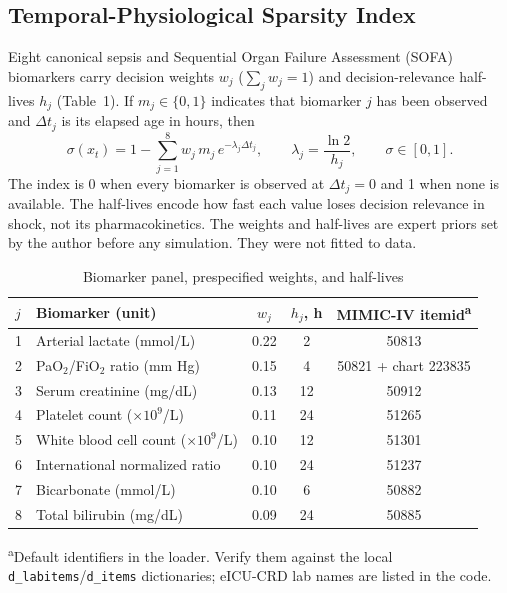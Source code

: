 \documentclass[11pt]{article}
\begin{document}
\subsection{Temporal-Physiological Sparsity Index}
Eight canonical sepsis and Sequential Organ Failure Assessment (SOFA) biomarkers\cite{singer2016,vincent1996} carry
decision weights $w_j$ ($\sum_j w_j=1$) and decision-relevance half-lives $h_j$ (Table~1). If $m_j\in\{0,1\}$ indicates
that biomarker $j$ has been observed and $\Delta t_j$ is its elapsed age in hours, then
\begin{equation}
\sigma(x_t)=1-\sum_{j=1}^{8} w_j\, m_j\, e^{-\lambda_j \Delta t_j},\qquad \lambda_j=\frac{\ln 2}{h_j},\qquad \sigma\in[0,1].
\end{equation}
The index is 0 when every biomarker is observed at $\Delta t_j=0$ and 1 when none is available. The half-lives encode how
fast each value loses decision relevance in shock, not its pharmacokinetics. The weights and half-lives are expert
priors set by the author before any simulation. They were not fitted to data.

\begin{table}[t]\centering\small
\caption{Biomarker panel, prespecified weights, and half-lives}
\begin{tabularx}{\linewidth}{lYccc}
\toprule
$j$ & Biomarker (unit) & $w_j$ & $h_j$, h & MIMIC-IV itemid\textsuperscript{a}\\
 & Arterial lactate (mmol/L) & 0.22 & 2 & 50813\\
2 & PaO$_2$/FiO$_2$ ratio (mm Hg) & 0.15 & 4 & 50821 + chart 223835\\
3 & Serum creatinine (mg/dL) & 0.13 & 12 & 50912\\
4 & Platelet count ($\times10^9$/L) & 0.11 & 24 & 51265\\
5 & White blood cell count ($\times10^9$/L) & 0.10 & 12 & 51301\\
6 & International normalized ratio & 0.10 & 24 & 51237\\
7 & Bicarbonate (mmol/L) & 0.10 & 6 & 50882\\
8 & Total bilirubin (mg/dL) & 0.09 & 24 & 50885\\
\bottomrule
\end{tabularx}
\par\smallskip\raggedright\footnotesize \textsuperscript{a}Default identifiers in the loader. Verify them against the local \texttt{d\_labitems}/\texttt{d\_items}
dictionaries; eICU-CRD lab names are listed in the code.
\end{table}
\end{document}
